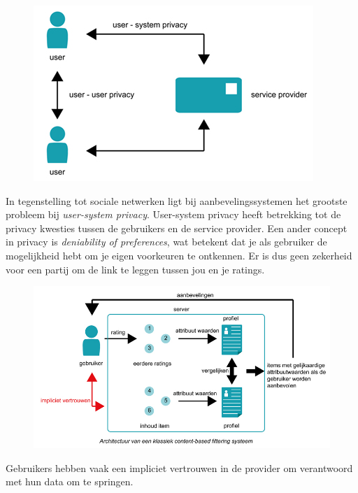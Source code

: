 \begin{figure}[htpb]   
    \label{Figuur::usersystemprivacy}      
  \begin{center}    
 \includegraphics[scale=0.6,keepaspectratio]{fig/user-user-system-privacy}    
  \end{center}     
   \end{figure}
   
In tegenstelling tot sociale netwerken ligt bij aanbevelingssystemen het grootste probleem bij \textit{user-system privacy}. User-system privacy heeft betrekking tot de privacy kwesties tussen de gebruikers en de service provider. Een ander concept in privacy is \emph{deniability of preferences}, wat betekent dat je als gebruiker de mogelijkheid hebt om je eigen voorkeuren te ontkennen. Er is dus geen zekerheid voor een partij om de link te leggen tussen jou en je ratings.

\begin{figure}[htpb]   
    \label{Figuur::randomisatie}      
  \begin{center}    
 \includegraphics[scale=0.5]{fig/klassiek_systeem}    
  \end{center}   
   
   \end{figure}
Gebruikers hebben vaak een impliciet vertrouwen in de provider om verantwoord met hun data om te springen. 


